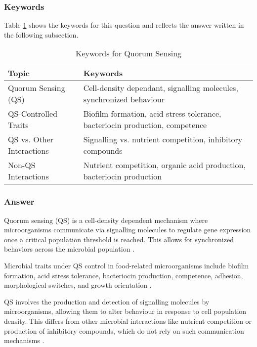 \subsubsection*{Keywords}
Table \ref{tab:KW-Quorum} shows the keywords for this question and reflects the answer written in the following subsection.
\begin{table}[h]
    \centering
    \caption{Keywords for Quorum Sensing} 
    \label{tab:KW-Quorum}
    \begin{tabular}{l|l}
        \textbf{Topic} & \textbf{Keywords} \\
        \hline
        Quorum Sensing (QS) & Cell-density dependant, signalling molecules, synchronized behaviour \\

        QS-Controlled Traits & Biofilm formation, acid stress tolerance, bacteriocin production, competence \\

        QS vs. Other Interactions & Signalling vs. nutrient competition, inhibitory compounds \\

        Non-QS Interactions & Nutrient competition, organic acid production, bacteriocin production \\
    \end{tabular}
\end{table}

\subsubsection*{Answer}
Quorum sensing (QS) is a cell-density dependent mechanism where microorganisms communicate via signalling molecules to regulate gene expression once a critical population threshold is reached. This allows for synchronized behaviors across the microbial population \cite*{L8-ImpQuorum}.

Microbial traits under QS control in food-related microorganisms include biofilm formation, acid stress tolerance, bacteriocin production, competence, adhesion, morphological switches, and growth orientation \cite*{L8-ImpQuorum}.

QS involves the production and detection of signalling molecules by microorganisms, allowing them to alter behaviour in response to cell population density. This differs from other microbial interactions like nutrient competition or production of inhibitory compounds, which do not rely on such communication mechanisms \cite*{L8-ImpQuorum}.

